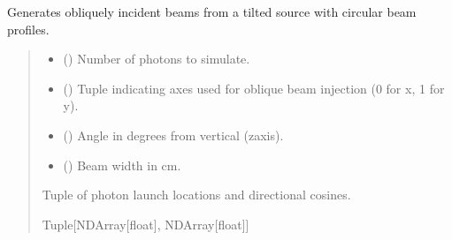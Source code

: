 \documentclass[letterpaper,10pt,english]{sphinxmanual}
\begin{document}

\begin{fulllineitems}
\label{\detokenize{generated/photon_canon.hardware:photon_canon.hardware.oblique_beams}}
\pysigstartsignatures
\pysiglinewithargsret
{}
{\sphinxparamcomma {}\sphinxparamcomma {}\sphinxparamcomma {}}
{}
\pysigstopsignatures
\sphinxAtStartPar
Generates obliquely incident beams from a tilted source with circular beam profiles.
\begin{quote}\begin{description}
\begin{itemize}
\item {} 
\sphinxAtStartPar
{} () \textendash{} Number of photons to simulate.

\item {} 
\sphinxAtStartPar
{} (\sphinxstyleliteralemphasis{\sphinxupquote{{[}}}\sphinxstyleliteralemphasis{\sphinxupquote{, }}\sphinxstyleliteralemphasis{\sphinxupquote{{]}}}) \textendash{} Tuple indicating axes used for oblique beam injection (0 for x, 1 for y).

\item {} 
\sphinxAtStartPar
{} () \textendash{} Angle in degrees from vertical (z\sphinxhyphen{}axis).

\item {} 
\sphinxAtStartPar
{} () \textendash{} Beam width in cm.

\end{itemize}

\sphinxAtStartPar
Tuple of photon launch locations and directional cosines.

\sphinxAtStartPar
Tuple{[}NDArray{[}float{]}, NDArray{[}float{]}{]}

\end{description}\end{quote}

\end{fulllineitems}
\end{document}
